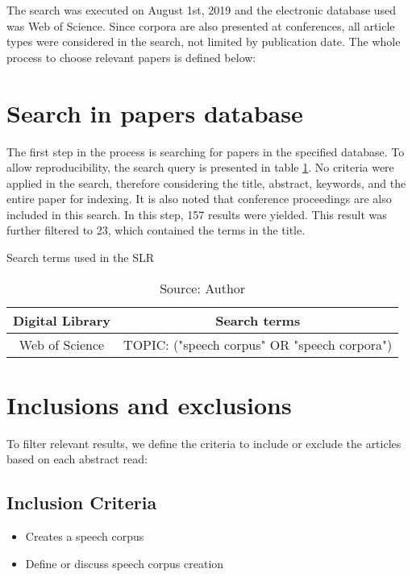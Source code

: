 The search was executed on August 1st, 2019 and the electronic database used was Web of Science. Since corpora are also presented at conferences, all article types were considered in the search, not limited by publication date. The whole process to choose relevant papers is defined below:

\section{Search in papers database}

The first step in the process is searching for papers in the specified database. To allow reproducibility, the search query is presented in table \ref{tab:search-terms}. No criteria were applied in the search, therefore considering the title, abstract, keywords, and the entire paper for indexing. It is also noted that conference proceedings are also included in this search. In this step, 157 results were yielded. This result was further filtered to 23, which contained the terms in the title.

\begin{table}[h]
    \centering
    \caption{Search terms used in the SLR}
    \begin{tabular}{|c|c|}
        \hline Digital Library & Search terms \\ \hline
        Web of Science & TOPIC: ("speech corpus" OR "speech corpora")  \\ \hline
    \end{tabular}
    \caption*{Source: Author}
    \label{tab:search-terms}
\end{table}

\section{Inclusions and exclusions}

To filter relevant results, we define the criteria to include or exclude the articles based on each abstract read:

\subsection*{Inclusion Criteria}

\begin{itemize}
    \item Creates a speech corpus
    \item Define or discuss speech corpus creation
\end{itemize}

